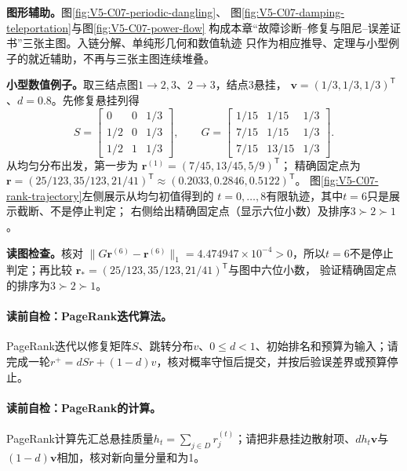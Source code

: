 \label{struct:V5-C07-CH17}
\textbf{图形辅助。}图\ref{fig:V5-C07-periodic-dangling}、
图\ref{fig:V5-C07-damping-teleportation}与图\ref{fig:V5-C07-power-flow}
构成本章“故障诊断--修复与阻尼--误差证书”三张主图。入链分解、单纯形几何和数值轨迹
只作为相应推导、定理与小型例子的就近辅助，不再与三张主图连续堆叠。

\label{struct:V5-C07-CH18}
\textbf{小型数值例子。}取三结点图$1\to2,3$、$2\to3$，结点$3$悬挂，
$\boldsymbol v=(1/3,1/3,1/3)^{\mathsf T}$、$d=0.8$。先修复悬挂列得
\[
S=\begin{bmatrix}0&0&1/3\\1/2&0&1/3\\1/2&1&1/3\end{bmatrix},
\qquad
G=\begin{bmatrix}1/15&1/15&1/3\\7/15&1/15&1/3\\7/15&13/15&1/3\end{bmatrix}.
\]
从均匀分布出发，第一步为
$\boldsymbol r^{(1)}=(7/45,13/45,5/9)^{\mathsf T}$；
精确固定点为
$\boldsymbol r=(25/123,35/123,21/41)^{\mathsf T}\approx(0.2033,0.2846,0.5122)^{\mathsf T}$。
图\ref{fig:V5-C07-rank-trajectory}左侧展示从均匀初值得到的
$t=0,\ldots,8$有限轨迹，其中$t=6$只是展示截断、不是停止判定；
右侧给出精确固定点（显示六位小数）及排序$3\succ2\succ1$。

\FloatBarrier
\noindent\textbf{读图检查。}核对
$\lVert G\boldsymbol r^{(6)}-\boldsymbol r^{(6)}\rVert_1
=4.474947\times10^{-4}>0$，所以$t=6$不是停止判定；再比较
$\boldsymbol r_*=(25/123,35/123,21/41)^{\mathsf T}$与图中六位小数，
验证精确固定点的排序为$3\succ2\succ1$。

\paragraph{读前自检：PageRank迭代算法。}PageRank迭代以修复矩阵$S$、跳转分布$v$、$0\le d<1$、初始排名和预算为输入；请完成一轮$r^+=dSr+(1-d)v$，核对概率守恒后提交，并按后验误差界或预算停止。\par
\paragraph{读前自检：PageRank的计算。}PageRank计算先汇总悬挂质量$h_t=\sum_{j\in D}r_j^{(t)}$；请把非悬挂边散射项、$dh_t\boldsymbol v$与$(1-d)\boldsymbol v$相加，核对新向量分量和为1。\par
